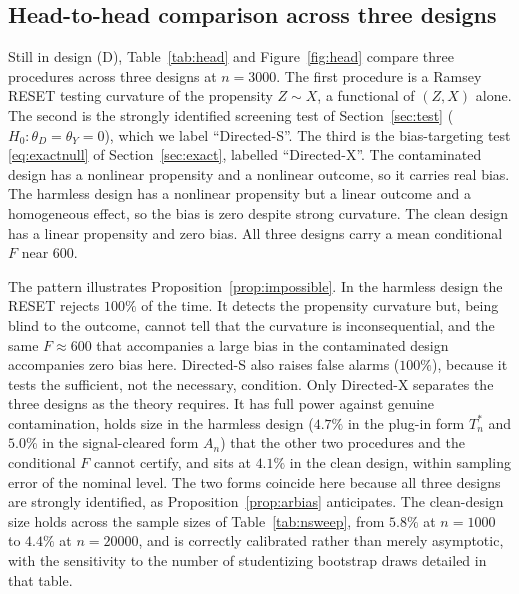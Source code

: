 \documentclass[preprint,11pt,authoryear]{elsarticle}
\theoremstyle{definition}
\begin{document}
\subsection{Head-to-head comparison across three designs}\label{sec:head}
Still in design (D), Table~\ref{tab:head} and Figure~\ref{fig:head} compare three
procedures across three designs at $n=3000$. The first procedure is a Ramsey RESET testing
curvature of the propensity $Z\sim X$, a functional of $(Z,X)$ alone. The second
is the strongly identified screening test of Section~\ref{sec:test}
($H_0:\theta_D=\theta_Y=0$), which we label ``Directed-S''. The third is the
bias-targeting test \eqref{eq:exactnull} of Section~\ref{sec:exact}, labelled
``Directed-X''. The contaminated design has a nonlinear propensity and a
nonlinear outcome, so it carries real bias. The harmless design has a
nonlinear propensity but a linear outcome and a homogeneous effect, so the bias
is zero despite strong curvature. The clean design has a linear propensity
and zero bias. All three designs carry a mean conditional $F$ near $600$.

The pattern illustrates Proposition~\ref{prop:impossible}. In the
harmless design the RESET rejects $100\%$ of the time. It detects the propensity
curvature but, being blind to the outcome, cannot tell that the curvature is
inconsequential, and the same $F\approx600$ that accompanies a large bias in the
contaminated design accompanies zero bias here. Directed-S also raises false alarms
($100\%$), because it tests the sufficient, not the necessary, condition. Only
Directed-X separates the three designs as the theory requires. It has full power
against genuine contamination, holds size in the harmless design ($4.7\%$ in the plug-in
form $T_n^{\ast}$ and $5.0\%$ in the signal-cleared form $A_n$) that the other two
procedures and the conditional $F$ cannot certify, and sits at $4.1\%$ in the clean
design, within sampling error of the nominal level. The two forms coincide here because
all three designs are strongly identified, as Proposition~\ref{prop:arbias} anticipates.
The clean-design size holds across the sample sizes of Table~\ref{tab:nsweep}, from
$5.8\%$ at $n=1000$ to $4.4\%$ at $n=\num{20000}$, and is correctly calibrated rather than
merely asymptotic, with the sensitivity to the number of studentizing bootstrap draws
detailed in that table.
\end{document}
